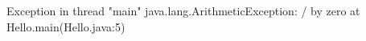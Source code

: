 \begin{small}
\begin{stdout}
    Exception in thread "main" java.lang.ArithmeticException: / by zero
    at Hello.main(Hello.java:5)
\end{stdout}
\end{small}
